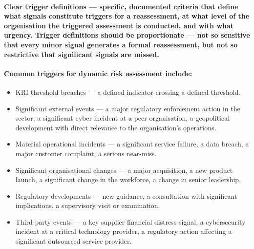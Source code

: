 \paragraph{\textbf{Clear trigger definitions} — specific, documented criteria that define what signals constitute triggers for a reassessment, at what level of the organisation the triggered assessment is conducted, and with what urgency. Trigger definitions should be proportionate — not so sensitive that every minor signal generates a formal reassessment, but not so restrictive that significant signals are missed.}
\paragraph{Common triggers for dynamic risk assessment include:}
\begin{itemize}
  \item{KRI threshold breaches — a defined indicator crossing a defined threshold.}
  \item{Significant external events — a major regulatory enforcement action in the sector, a significant cyber incident at a peer organisation, a geopolitical development with direct relevance to the organisation's operations.}
  \item{Material operational incidents — a significant service failure, a data breach, a major customer complaint, a serious near-miss.}
  \item{Significant organisational changes — a major acquisition, a new product launch, a significant change in the workforce, a change in senior leadership.}
  \item{Regulatory developments — new guidance, a consultation with significant implications, a supervisory visit or examination.}
  \item{Third-party events — a key supplier financial distress signal, a cybersecurity incident at a critical technology provider, a regulatory action affecting a significant outsourced service provider.}
\end{itemize}
